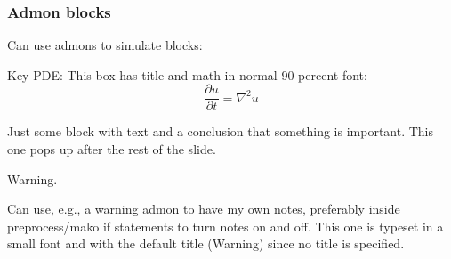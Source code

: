 \documentclass{beamer}
\newenvironment{graybox1admon}[1][]{\begin{block}{#1}}{\end{block}}
\begin{document}
\begin{frame}
\frametitle{Admon blocks}

Can use admons to simulate blocks:


\begin{graybox1admon}[Key PDE:]
This box has title and math in normal 90 percent font:
\[ \frac{\partial u}{\partial t} = \nabla^2 u \]
\end{graybox1admon}


\pause
\begin{graybox1admon}[]
Just some block with text and a conclusion that something is important.
This one pops up after the rest of the slide.
\end{graybox1admon}



\begin{graybox1admon}[Warning.]
\vspace{0.5mm}\par\noindent
{\footnotesize Can use, e.g., a warning admon to have my own notes, preferably
inside preprocess/mako if statements to turn notes on and off.
This one is typeset in a small font and with the default
title (Warning) since no title is specified. \par}
\end{graybox1admon}
\end{frame}
\end{document}
